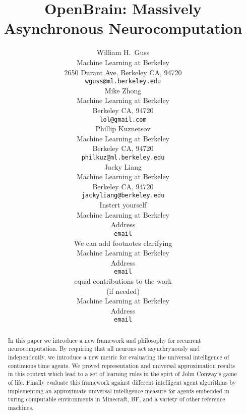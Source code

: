 \documentclass{article} %
\title{OpenBrain: Massively Asynchronous Neurocomputation}
\author{
William H.~Guss \\
Machine Learning at Berkeley\\
2650 Durant Ave, Berkeley CA, 94720 \\
\texttt{wguss@ml.berkeley.edu} \\
\And
Mike Zhong \\
Machine Learning at Berkeley \\
Berkeley CA, 94720 \\
\texttt{lol@gmail.com} \\
\And
Phillip Kuznetsov \\
Machine Learning at Berkeley \\
Berkeley CA, 94720 \\
\texttt{philkuz@ml.berkeley.edu} \\
\And
Jacky Liang \\
Machine Learning at Berkeley \\
Berkeley CA, 94720 \\
\texttt{jackyliang@berkeley.edu} \\
\And
Instert yourself \\
Machine Learning at Berkeley \\
Address \\
\texttt{email} \\
\And
We can add footnotes clarifying \\
Machine Learning at Berkeley \\
Address \\
\texttt{email} \\
\And
equal contributions to the work \\
(if needed)\\
Machine Learning at Berkeley \\
Address \\
\texttt{email} 
}
\numberwithin{equation}{subsection}
\numberwithin{theorem}{subsection}
\begin{document}
\maketitle

\begin{abstract}
	In this paper we introduce a new framework and philosophy for recurrent neurocomputation. By requiring that all neurons act asynchrynously and independently, we introduce a new metric for evaluating the universal intelligence of continuous time agents. We proved representation and universal approximation results in this context which lead to a set of learning rules in the spirt of John Conway's game of life. Finally evaluate this framework against different intelligent agent algorithms by implementing an approximate universal intelligence measure for agents embedded in turing computable environments in Minecraft, BF, and a variety of other reference machines. 
\end{abstract}


\listoftodos






\printbibliography


\end{document}
